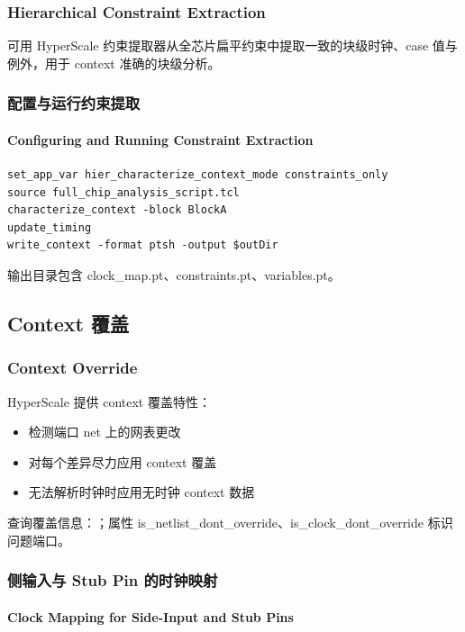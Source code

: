 \subsubsection*{Hierarchical Constraint Extraction}

可用 HyperScale 约束提取器从全芯片扁平约束中提取一致的块级时钟、case 值与例外，用于 context 准确的块级分析。

\subsubsection{配置与运行约束提取}
\paragraph*{Configuring and Running Constraint Extraction}

\begin{lstlisting}
set_app_var hier_characterize_context_mode constraints_only
source full_chip_analysis_script.tcl
characterize_context -block BlockA
update_timing
write_context -format ptsh -output $outDir
\end{lstlisting}

输出目录包含 clock_map.pt、constraints.pt、variables.pt。

\subsection{Context 覆盖}
\subsubsection*{Context Override}

HyperScale 提供 context 覆盖特性：
\begin{itemize}
  \item 检测端口 net 上的网表更改
  \item 对每个差异尽力应用 context 覆盖
  \item 无法解析时钟时应用无时钟 context 数据
\end{itemize}

查询覆盖信息：；属性 is_netlist_dont_override、is_clock_dont_override 标识问题端口。

\subsubsection{侧输入与 Stub Pin 的时钟映射}
\paragraph*{Clock Mapping for Side-Input and Stub Pins}


